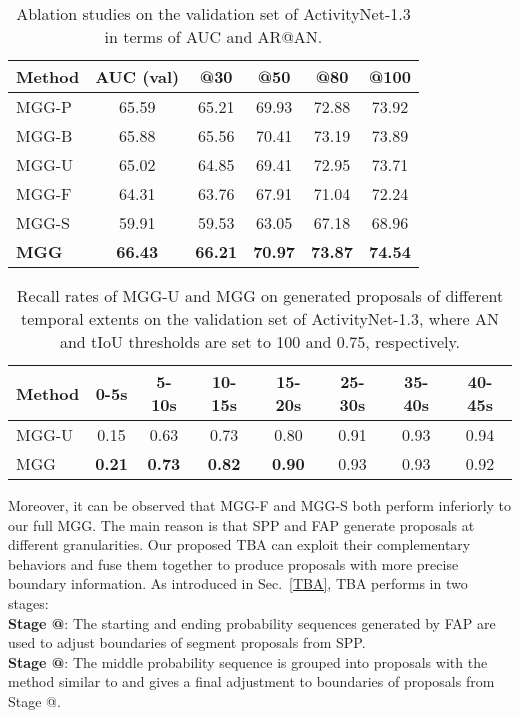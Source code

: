 \documentclass[10pt,twocolumn,letterpaper]{article}
\makeatletter
\newcommand*{\rom}[1]{\expandafter\@slowromancap\romannumeral #1@}
\makeatother
\begin{document}
\begin{table}
\centering \small \caption{\label{ablation3_module} 
Ablation studies on the validation set of ActivityNet-1.3 in terms of AUC and AR@AN.}
\begin{tabular}{l|c|c|c|c|c}
\toprule Method & AUC (val)&@30&@50&@80&@100\\\midrule
MGG-P &65.59&65.21&69.93&72.88&73.92\\
MGG-B & 65.88&65.56&70.41&73.19&73.89\\
MGG-U & 65.02&64.85&69.41&72.95&73.71\\
MGG-F & 64.31&63.76&67.91&71.04&72.24\\
MGG-S & 59.91    & 59.53    &  63.05   & 67.18    &  68.96    \\
\textbf{MGG} & \textbf{66.43}&\textbf{66.21}&\textbf{70.97}&\textbf{73.87}&\textbf{74.54}\\
\bottomrule
\end{tabular}
\end{table}

\begin{table}
\centering \scriptsize \caption{\label{ablation_U} 
Recall rates of MGG-U and MGG on generated proposals of different temporal extents on the validation set of ActivityNet-1.3, where AN and tIoU thresholds are set to 100 and 0.75, respectively.}
\begin{tabular}{l|c|c|c|c|c|c|c}
\toprule Method &0-5s&5-10s&10-15s&15-20s&25-30s&35-40s&40-45s\\\midrule
MGG-U & 0.15&0.63&0.73&0.80&0.91&0.93&0.94\\
MGG & \textbf{0.21}&\textbf{0.73}&\textbf{0.82}&\textbf{0.90}&0.93&0.93&0.92\\
\bottomrule
\end{tabular}
\end{table}

Moreover, it can be observed that MGG-F and MGG-S both perform inferiorly to our full MGG. The main reason is that SPP and FAP generate proposals at different granularities. Our proposed TBA can exploit their complementary behaviors and fuse them together to produce proposals with more precise boundary information. As introduced in Sec.~\ref{TBA}, TBA performs in two stages:\\
\textbf{Stage \rom{1}}: The starting and ending probability sequences generated by FAP are used to adjust boundaries of segment proposals from SPP.\\
\textbf{Stage \rom{2}}: The middle probability sequence is grouped into proposals with the method similar to \cite{TAG} and gives a final adjustment to boundaries of proposals from Stage \rom{1}.
\end{document}

